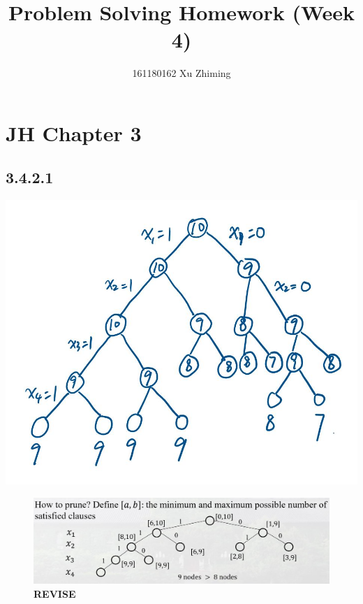 \documentclass[twocolumn, 10.5pt]{article}
\begin{document}
	\title{Problem Solving Homework (Week 4)}\author{161180162 Xu Zhiming}\maketitle
	\section*{JH Chapter 3}
	\subsection*{3.4.2.1}
		\includegraphics[scale=0.32]{ex4-1.jpg}
	\begin{figure}[H]
		\centering
		\includegraphics[width=1\linewidth]{hw4-2.png}
		\caption{\textbf{REVISE}}
	\end{figure}
\end{document}
